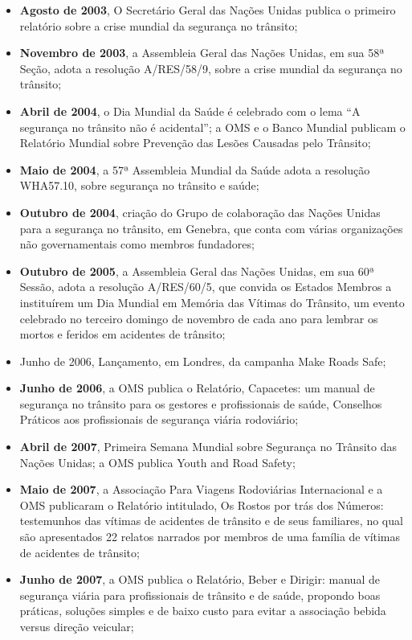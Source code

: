 \documentclass[output=paper,colorlinks,citecolor=green]{langscibook}
\begin{document}
\begin{itemize}
\item \textbf{Agosto de 2003}, O Secretário Geral das Nações Unidas publica o primeiro relatório sobre a crise mundial da segurança no trânsito;
\item \textbf{Novembro de 2003}, a Assembleia Geral das Nações Unidas, em sua 58ª Seção, adota a resolução A/RES/58/9, sobre a crise mundial da segurança no trânsito;
\item \textbf{Abril de 2004}, o Dia Mundial da Saúde é celebrado com o lema “A segurança no trânsito não é acidental”; a OMS e o Banco Mundial publicam o Relatório Mundial sobre Prevenção das Lesões Causadas pelo Trânsito;
\item \textbf{Maio de 2004}, a 57ª Assembleia Mundial da Saúde adota a resolução WHA57.10, sobre segurança no trânsito e saúde;
\item \textbf{Outubro de 2004}, criação do Grupo de colaboração das Nações Unidas para a segurança no trânsito, em Genebra, que conta com várias organizações não governamentais como membros fundadores;
\item \textbf{Outubro de 2005}, a Assembleia Geral das Nações Unidas, em sua 60ª Sessão, adota a resolução A/RES/60/5, que convida os Estados Membros a instituírem um Dia Mundial em Memória das Vítimas do Trânsito, um evento celebrado no terceiro domingo de novembro de cada ano para lembrar os mortos e feridos em acidentes de trânsito;
\item Junho de 2006, Lançamento, em Londres, da campanha Make Roads Safe;
\item \textbf{Junho de 2006}, a OMS publica o Relatório, Capacetes: um manual de segurança no trânsito para os gestores e profissionais de saúde, Conselhos Práticos aos profissionais de segurança viária rodoviário;
\item \textbf{Abril de 2007}, Primeira Semana Mundial sobre Segurança no Trânsito das Nações Unidas; a OMS publica Youth and Road Safety;
\item \textbf{Maio de 2007}, a Associação Para Viagens Rodoviárias Internacional e a OMS publicaram o Relatório intitulado, Os Rostos por trás dos Números: testemunhos das vítimas de acidentes de trânsito e de seus familiares, no qual são apresentados 22 relatos narrados por membros de uma família de vítimas de acidentes de trânsito;
\item \textbf{Junho de 2007}, a OMS publica o Relatório, Beber e Dirigir: manual de segurança viária para profissionais de trânsito e de saúde, propondo boas práticas, soluções simples e de baixo custo para evitar a associação bebida versus direção veicular;

\end{itemize}
\end{document}

